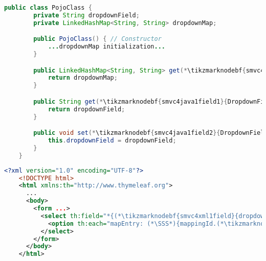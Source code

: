 \newpage

\begin{lstlisting}[language=Java, title={POJO class with one String field}]
    public class PojoClass {
        private String dropdownField;
        private LinkedHashMap<String, String> dropdownMap;

        public PojoClass() { // Constructor
            ...dropdownMap initialization...
        }

        public LinkedHashMap<String, String> get(*\tikzmarknodebf{smvc4java1map}{DropdownMap}*)() {
            return dropdownMap;
        }

        public String get(*\tikzmarknodebf{smvc4java1field1}{DropdownField}*)() {
            return dropdownField;
        }

        public void set(*\tikzmarknodebf{smvc4java1field2}{DropdownField}*)(String dropdownField) {
            this.dropdownField = dropdownField;
        }
    }
\end{lstlisting}
\begin{lstlisting}[language=XML, title={HTML form setting the field}]
    <?xml version="1.0" encoding="UTF-8"?>
    <!DOCTYPE html>
    <html xmlns:th="http://www.thymeleaf.org">
      ...
      <body>
        <form ...>
          <select th:field="*{(*\tikzmarknodebf{smvc4xml1field}{dropdownField}[ForestGreen]*)}">
            <option th:each="mapEntry: (*\SSS*){mappingId.(*\tikzmarknodebf{smvc4xml1map}{dropdownMap}[ForestGreen]*).entrySet()}" th:value="${mapEntry.key}" th:text="${mapEntry.value}"/>
          </select>
        </form>
      </body>
    </html>
\end{lstlisting}

